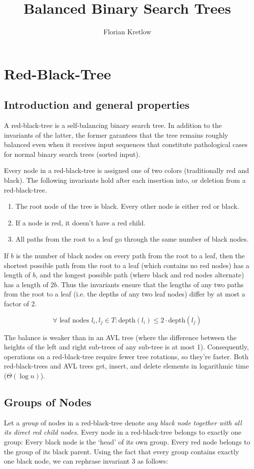 \documentclass{article}
\title{Balanced Binary Search Trees}
\author{Florian Kretlow}
\begin{document}
\section{Red-Black-Tree}

\subsection{Introduction and general properties}
A red-black-tree is a self-balancing binary search tree. In addition to the invariants
of the latter, the former garantees that the tree remains roughly balanced even when it
receives input sequences that constitute pathological cases for normal binary search
trees (sorted input).

Every node in a red-black-tree is assigned one of two colors (traditionally red and
black). The following invariants hold after each insertion into, or deletion from a
red-black-tree.

\begin{enumerate}[label=(\arabic*)]
\item The root node of the tree is black. Every other node is either red or black.
\item If a node is red, it doesn't have a red child.
\item All paths from the root to a leaf go through the same number of black nodes.
\end{enumerate}

If \(b\) is the number of black nodes on every path from the root to a leaf, then the
shortest possible path from the root to a leaf (which contains no red nodes) has a
length of \(b\), and the longest possible path (where black and red nodes alternate) has
a length of \(2b\).  Thus the invariants ensure that the lengths of any two paths from
the root to a leaf (i.e. the depths of any two leaf nodes) differ by at most a factor of
2.

\[
\forall \text{ leaf nodes } l_{i}, l_{j} \in T : \text{depth}(l_i) \leq 2 \cdot
\text{depth}(l_j)
\]

The balance is weaker than in an AVL tree (where the difference between the heights of
the left and right sub-trees of any sub-tree is at most 1). Consequently, operations on
a red-black-tree require fewer tree rotations, so they’re faster. Both red-black-trees
and AVL trees get, insert, and delete elements in logarithmic time (\(\Theta(\log n)\)).

\subsection{Groups of Nodes}
Let a \emph{group} of nodes in a red-black-tree denote \emph{any black node together
with all its direct red child nodes.} Every node in a red-black-tree belongs to exactly
one group: Every black node is the ‘head’ of its own group. Every red node belongs
to the group of its black parent. Using the fact that every group contains exactly one
black node, we can rephrase invariant 3 as follows:
\end{document}
